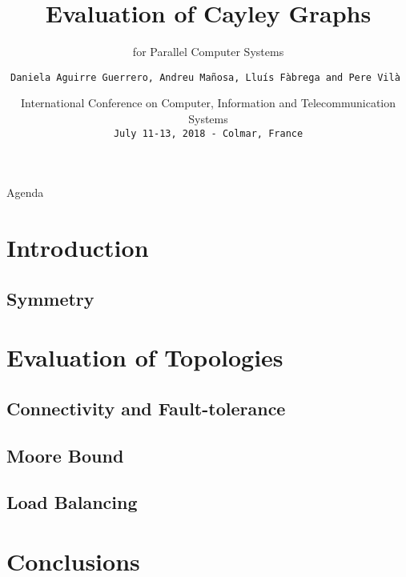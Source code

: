 \documentclass[newPxFont,sthlmFooter,nionpage]{beamer}
\title{Evaluation of Cayley Graphs}
\subtitle{for Parallel Computer Systems}
\date{International Conference on Computer, Information and Telecommunication Systems\\ \texttt{\small{\textcolor{black!80}{July 11-13, 2018 - Colmar, France}}}}
\author{\texttt{Daniela Aguirre Guerrero, Andreu Ma\~nosa, Llu\'is F\`abrega and Pere Vil\`a }}
\institute{
Universitat de Girona\\
}
\numberwithin{teo}{section}
\numberwithin{cor}{section}
\numberwithin{pro}{section}
\begin{document}
%
%

\maketitle


%
%
\begin{frame}[plain]{Agenda}
    \tableofcontents
\end{frame}


%
%
\section{Introduction}

\subsection{Symmetry}

\section{Evaluation of Topologies}
\subsection{Connectivity and Fault-tolerance}

\subsection{Moore Bound}

\subsection{Load Balancing}


\section{Conclusions}


%
%

%  
%  

%
\end{document}
